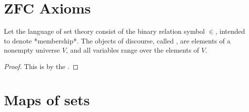 \nocite{*}

\section{ZFC Axioms}

\begin{notation}
Let the language of set theory consist of the binary relation symbol $\in$, intended to denote *membership*. The objects of discourse, called , are elements of a nonempty universe $V$, and all variables range over the elements of $V$.
\end{notation}








\begin{proof}
    This is by the .
\end{proof}











\section{Maps of sets}











